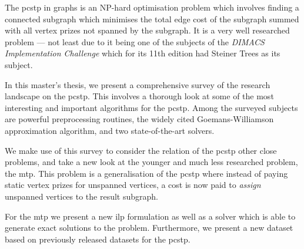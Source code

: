 The \gls{pcstp} in graphs is an NP-hard optimisation problem which involves
finding a connected subgraph which minimises the total edge cost of
the subgraph summed with all vertex prizes not spanned by the subgraph.
It is a very well researched problem --- not least due to it being one of the
subjects of the \textit{DIMACS Implementation Challenge} which
for its 11th edition had Steiner Trees as its subject.

In this master's thesis, we present a comprehensive survey of the research landscape
on the \gls{pcstp}. This involves a thorough look at some of the most interesting
and important algorithms for the \gls{pcstp}. Among the surveyed subjects are
powerful preprocessing routines, the widely cited Goemans-Williamson approximation
algorithm, and two state-of-the-art solvers.

We make use of this survey to consider the relation of the \gls{pcstp} other close
 problems, and take a new look at the younger and much less researched problem, the
\gls{mtp}. This problem is a generalisation of the \gls{pcstp} where instead of paying
static vertex prizes for unspanned vertices, a cost is now paid to \textit{assign}
unspanned vertices to the result subgraph.

For the \gls{mtp} we present a new \acrlong{ilp} formulation as well as a solver which
is able to generate exact solutions to the problem. Furthermore, we present a new
dataset based on previously released datasets for the \gls{pcstp}.

